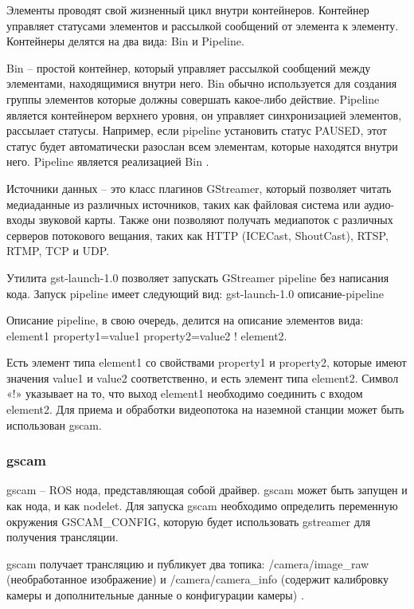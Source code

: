 Элементы проводят свой жизненный цикл внутри контейнеров. Контейнер управляет статусами элементов и рассылкой сообщений от элемента к элементу. Контейнеры делятся на два вида: Bin и Pipeline.

Bin -- простой контейнер, который управляет рассылкой сообщений между элементами, находящимися внутри него. Bin обычно используется для создания группы элементов которые должны совершать какое-либо действие. 
Pipeline является контейнером верхнего уровня, он управляет синхронизацией элементов, рассылает статусы. Например, если pipeline установить статус PAUSED, этот статус будет автоматически разослан всем элементам, которые находятся внутри него. Pipeline является реализацией Bin \cite{gstreamer}. 

Источники данных -- это класс плагинов GStreamer, который позволяет читать медиаданные из различных источников, таких как файловая система или аудио-входы звуковой карты. Также они позволяют получать медиапоток с различных серверов потокового вещания, таких как HTTP (ICECast, ShoutCast), RTSP, RTMP, TCP и UDP. 

Утилита gst-launch-1.0 позволяет запускать GStreamer pipeline без написания кода. Запуск pipeline имеет следующий вид:
gst-launch-1.0 описание-pipeline

Описание pipeline, в свою очередь, делится на описание элементов вида:
element1 property1=value1 property2=value2 ! element2.

Есть элемент типа element1 со свойствами property1 и property2, которые имеют значения value1 и value2 соответственно, и есть элемент типа element2. Символ «!» указывает на то, что выход element1 необходимо соединить с входом element2.
Для приема и обработки видеопотока на наземной станции может быть использован gscam.

\subsubsection{gscam}
gscam -- ROS нода, представляющая собой драйвер. gscam может быть запущен и как нода, и как nodelet.
Для запуска gscam необходимо определить переменную окружения GSCAM\_CONFIG, которую будет использовать gstreamer для получения трансляции.

gscam получает трансляцию и публикует два топика: /camera/image\_raw (необработанное изображение) и /camera/camera\_info (содержит калибровку камеры и дополнительные данные о конфигурации камеры) \cite{ros}.

